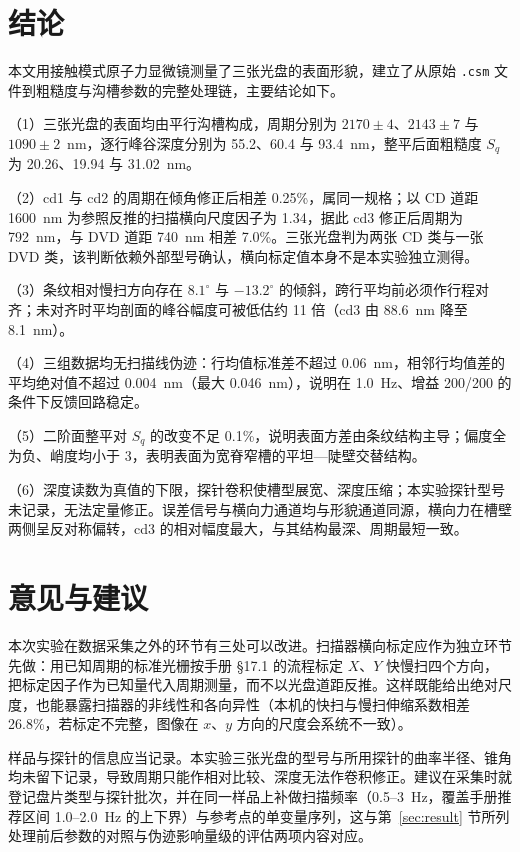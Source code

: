 \documentclass[12pt,a4paper,fontset=windows]{ctexart}
\begin{document}
\section{结论}\label{sec:concl}

本文用接触模式原子力显微镜测量了三张光盘的表面形貌，建立了从原始 \texttt{.csm} 文件到粗糙度与沟槽参数的完整处理链，主要结论如下。

（1）三张光盘的表面均由平行沟槽构成，周期分别为 $2170\pm4$、$2143\pm7$ 与 $1090\pm2$~nm，逐行峰谷深度分别为 55.2、60.4 与 93.4~nm，整平后面粗糙度 $S_q$ 为 20.26、19.94 与 31.02~nm。

（2）cd1 与 cd2 的周期在倾角修正后相差 0.25\%，属同一规格；以 CD 道距 1600~nm 为参照反推的扫描横向尺度因子为 1.34，据此 cd3 修正后周期为 792~nm，与 DVD 道距 740~nm 相差 7.0\%。三张光盘判为两张 CD 类与一张 DVD 类，该判断依赖外部型号确认，横向标定值本身不是本实验独立测得。

（3）条纹相对慢扫方向存在 $8.1^\circ$ 与 $-13.2^\circ$ 的倾斜，跨行平均前必须作行程对齐；未对齐时平均剖面的峰谷幅度可被低估约 11 倍（cd3 由 88.6~nm 降至 8.1~nm）。

（4）三组数据均无扫描线伪迹：行均值标准差不超过 0.06~nm，相邻行均值差的平均绝对值不超过 0.004~nm（最大 0.046~nm），说明在 1.0~Hz、增益 200/200 的条件下反馈回路稳定。

（5）二阶面整平对 $S_q$ 的改变不足 0.1\%，说明表面方差由条纹结构主导；偏度全为负、峭度均小于 3，表明表面为宽脊窄槽的平坦—陡壁交替结构。

（6）深度读数为真值的下限，探针卷积使槽型展宽、深度压缩；本实验探针型号未记录，无法定量修正。误差信号与横向力通道均与形貌通道同源，横向力在槽壁两侧呈反对称偏转，cd3 的相对幅度最大，与其结构最深、周期最短一致。

\section{意见与建议}\label{sec:suggest}

本次实验在数据采集之外的环节有三处可以改进。扫描器横向标定应作为独立环节先做：用已知周期的标准光栅按手册 §17.1 的流程标定 $X$、$Y$ 快慢扫四个方向，把标定因子作为已知量代入周期测量，而不以光盘道距反推。这样既能给出绝对尺度，也能暴露扫描器的非线性和各向异性（本机的快扫与慢扫伸缩系数相差 26.8\%，若标定不完整，图像在 $x$、$y$ 方向的尺度会系统不一致）。

样品与探针的信息应当记录。本实验三张光盘的型号与所用探针的曲率半径、锥角均未留下记录，导致周期只能作相对比较、深度无法作卷积修正。建议在采集时就登记盘片类型与探针批次，并在同一样品上补做扫描频率（0.5--3~Hz，覆盖手册推荐区间 1.0--2.0~Hz 的上下界）与参考点的单变量序列，这与第~\ref{sec:result} 节所列处理前后参数的对照与伪迹影响量级的评估两项内容对应。
\end{document}
